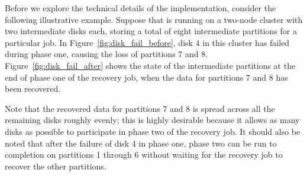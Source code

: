 Before we explore the technical details of the implementation, consider the
following illustrative example. Suppose that \themis is running on a two-node
cluster with two intermediate disks each, storing a total of eight intermediate
partitions for a particular job. In Figure~\ref{fig:disk_fail_before}, disk 4
in this cluster has failed during phase one, causing the loss of partitions 7
and 8. Figure~\ref{fig:disk_fail_after} shows the state of the intermediate
partitions at the end of phase one of the recovery job, when the data for
partitions 7 and 8 has been recovered.

Note that the recovered data for partitions 7 and 8 is spread across all the
remaining disks roughly evenly; this is highly desirable because it allows as
many disks as possible to participate in phase two of the recovery job. It
should also be noted that after the failure of disk 4 in phase one, phase two
can be run to completion on partitions 1 through 6 without waiting for the
recovery job to recover the other partitions.

